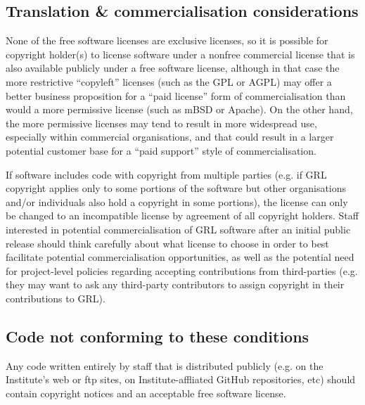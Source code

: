 \documentclass[10pt,a4paper]{article}
\begin{document}
\subsection{Translation \& commercialisation considerations}

\par None of the free software licenses are exclusive licenses, so it 
is possible for copyright holder(s) to license software under 
a nonfree commercial license that is also available publicly under a free 
software license, although in that case the more restrictive ``copyleft'' 
licenses (such as the GPL or AGPL) may offer a better business
proposition for a ``paid license'' form of commercialisation than would 
a more permissive license (such as mBSD or Apache). On the other hand, 
the more permissive licenses may tend to result in more widespread use, 
especially within commercial organisations, and that could result in a 
larger potential customer base for a ``paid support'' style of commercialisation. 

\par If software includes code with copyright from multiple parties 
(e.g. if GRL copyright applies only to some portions of the software but other 
organisations and/or individuals also hold a copyright in some portions), the 
license can only be changed to an incompatible license by agreement of all 
copyright holders. Staff interested in potential commercialisation of GRL 
software after an initial public release should think carefully about what 
license to choose in order to best facilitate potential commercialisation 
opportunities, as well as the potential need for project-level policies 
regarding accepting contributions from third-parties (e.g. they may want to 
ask any third-party contributors to assign copyright in their contributions to 
GRL). 


\subsection{Code not conforming to these conditions}

\par Any code written entirely by staff that is distributed publicly (e.g. on the 
Institute's web or ftp sites, on Institute-affliated GitHub repositories, etc) 
should contain copyright notices and an acceptable free software license. 
\end{document}
